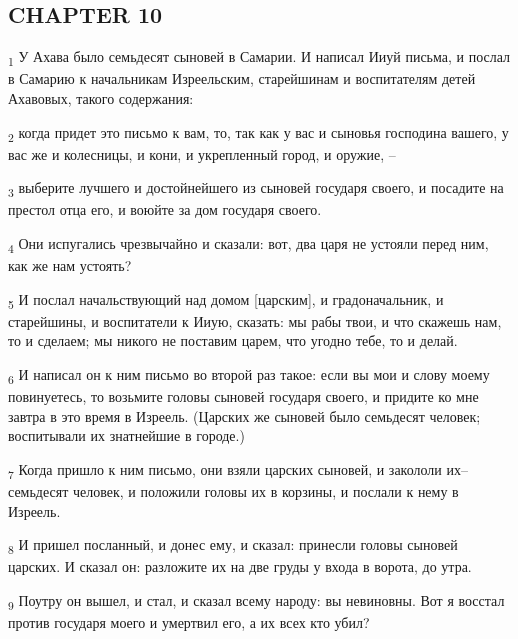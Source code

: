 \subsection{CHAPTER 10}
\begin{tcolorbox}
\textsubscript{1} У Ахава было семьдесят сыновей в Самарии. И написал Ииуй письма, и послал в Самарию к начальникам Изреельским, старейшинам и воспитателям детей Ахавовых, такого содержания:
\end{tcolorbox}
\begin{tcolorbox}
\textsubscript{2} когда придет это письмо к вам, то, так как у вас и сыновья господина вашего, у вас же и колесницы, и кони, и укрепленный город, и оружие, --
\end{tcolorbox}
\begin{tcolorbox}
\textsubscript{3} выберите лучшего и достойнейшего из сыновей государя своего, и посадите на престол отца его, и воюйте за дом государя своего.
\end{tcolorbox}
\begin{tcolorbox}
\textsubscript{4} Они испугались чрезвычайно и сказали: вот, два царя не устояли перед ним, как же нам устоять?
\end{tcolorbox}
\begin{tcolorbox}
\textsubscript{5} И послал начальствующий над домом [царским], и градоначальник, и старейшины, и воспитатели к Ииую, сказать: мы рабы твои, и что скажешь нам, то и сделаем; мы никого не поставим царем, что угодно тебе, то и делай.
\end{tcolorbox}
\begin{tcolorbox}
\textsubscript{6} И написал он к ним письмо во второй раз такое: если вы мои и слову моему повинуетесь, то возьмите головы сыновей государя своего, и придите ко мне завтра в это время в Изреель. (Царских же сыновей было семьдесят человек; воспитывали их знатнейшие в городе.)
\end{tcolorbox}
\begin{tcolorbox}
\textsubscript{7} Когда пришло к ним письмо, они взяли царских сыновей, и закололи их--семьдесят человек, и положили головы их в корзины, и послали к нему в Изреель.
\end{tcolorbox}
\begin{tcolorbox}
\textsubscript{8} И пришел посланный, и донес ему, и сказал: принесли головы сыновей царских. И сказал он: разложите их на две груды у входа в ворота, до утра.
\end{tcolorbox}
\begin{tcolorbox}
\textsubscript{9} Поутру он вышел, и стал, и сказал всему народу: вы невиновны. Вот я восстал против государя моего и умертвил его, а их всех кто убил?
\end{tcolorbox}

